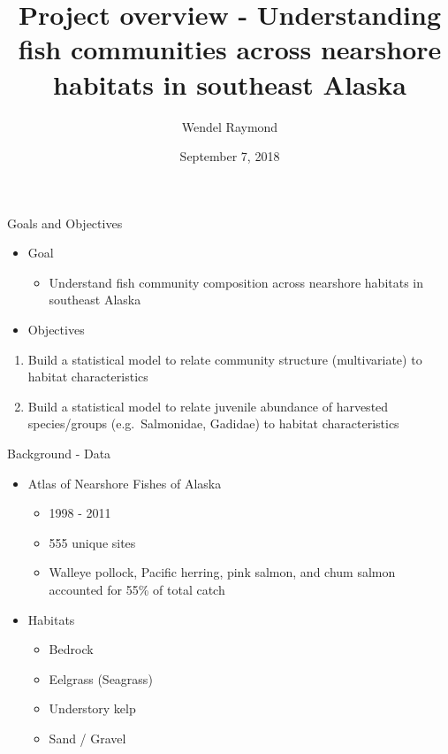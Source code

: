 \documentclass[ignorenonframetext,]{beamer}
\title{Project overview - Understanding fish communities across nearshore
habitats in southeast Alaska}
\author{Wendel Raymond}
\date{September 7, 2018}
\providecommand{\tightlist}{%
  \setlength{\itemsep}{0pt}\setlength{\parskip}{0pt}}
\begin{document}
\frame{\titlepage}

\begin{frame}{Goals and Objectives}

\begin{itemize}
\tightlist
\item
  Goal

  \begin{itemize}
  \tightlist
  \item
    Understand fish community composition across nearshore habitats in
    southeast Alaska
  \end{itemize}
\item
  Objectives
\end{itemize}

\begin{enumerate}
\def\labelenumi{\arabic{enumi}.}
\tightlist
\item
  Build a statistical model to relate community structure (multivariate)
  to habitat characteristics
\item
  Build a statistical model to relate juvenile abundance of harvested
  species/groups (e.g.~Salmonidae, Gadidae) to habitat characteristics
\end{enumerate}

\end{frame}

\begin{frame}{Background - Data}

\begin{itemize}
\tightlist
\item
  Atlas of Nearshore Fishes of Alaska

  \begin{itemize}
  \tightlist
  \item
    1998 - 2011
  \item
    555 unique sites
  \item
    Walleye pollock, Pacific herring, pink salmon, and chum salmon
    accounted for 55\% of total catch
  \end{itemize}
\item
  Habitats

  \begin{itemize}
  \tightlist
  \item
    Bedrock
  \item
    Eelgrass (Seagrass)
  \item
    Understory kelp
  \item
    Sand / Gravel
  \end{itemize}
\end{itemize}

\end{frame}
\end{document}
